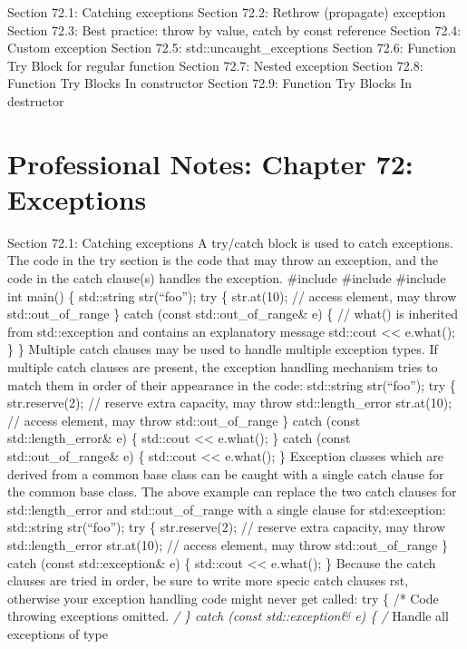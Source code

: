 Section 72.1: Catching exceptions Section 72.2: Rethrow (propagate)
exception Section 72.3: Best practice: throw by value, catch by const
reference Section 72.4: Custom exception Section 72.5:
std::uncaught\_exceptions Section 72.6: Function Try Block for regular
function Section 72.7: Nested exception Section 72.8: Function Try
Blocks In constructor Section 72.9: Function Try Blocks In destructor

\hypertarget{professional-notes-chapter-72-exceptions-1}{%
\chapter{Professional Notes: Chapter 72:
Exceptions}\label{professional-notes-chapter-72-exceptions-1}}

Section 72.1: Catching exceptions A try/catch block is used to catch
exceptions. The code in the try section is the code that may throw an
exception, and the code in the catch clause(s) handles the exception.
\#include \#include \#include int main() \{ std::string str(``foo'');
try \{ str.at(10); // access element, may throw std::out\_of\_range \}
catch (const std::out\_of\_range\& e) \{ // what() is inherited from
std::exception and contains an explanatory message std::cout
\textless\textless{} e.what(); \} \} Multiple catch clauses may be used
to handle multiple exception types. If multiple catch clauses are
present, the exception handling mechanism tries to match them in order
of their appearance in the code: std::string str(``foo''); try \{
str.reserve(2); // reserve extra capacity, may throw std::length\_error
str.at(10); // access element, may throw std::out\_of\_range \} catch
(const std::length\_error\& e) \{ std::cout \textless\textless{}
e.what(); \} catch (const std::out\_of\_range\& e) \{ std::cout
\textless\textless{} e.what(); \} Exception classes which are derived
from a common base class can be caught with a single catch clause for
the common base class. The above example can replace the two catch
clauses for std::length\_error and std::out\_of\_range with a single
clause for std:exception: std::string str(``foo''); try \{
str.reserve(2); // reserve extra capacity, may throw std::length\_error
str.at(10); // access element, may throw std::out\_of\_range \} catch
(const std::exception\& e) \{ std::cout \textless\textless{} e.what();
\} Because the catch clauses are tried in order, be sure to write more
specic catch clauses rst, otherwise your exception handling code might
never get called: try \{ /* Code throwing exceptions omitted. \emph{/ \}
catch (const std::exception\& e) \{ /} Handle all exceptions of type
